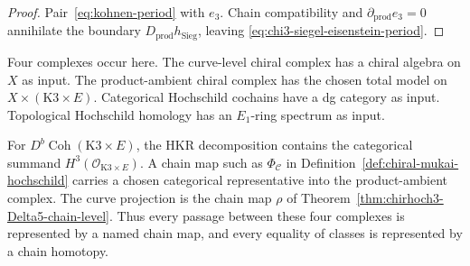 \begin{proof}
Pair~\eqref{eq:kohnen-period} with \(e_3\).  Chain compatibility and
\(\partial_{\mathrm{prod}}e_3=0\) annihilate the boundary
\(D_{\mathrm{prod}}h_{\mathrm{Sieg}}\), leaving
\eqref{eq:chi3-siegel-eisenstein-period}.
\end{proof}

\begin{remark}
\label{rem:chirhoch3-Delta5-scope-discipline}
Four complexes occur here.  The curve-level chiral complex has a chiral
algebra on \(X\) as input.  The product-ambient chiral complex has the
chosen total model on \(X\times(\mathrm{K3}\times E)\).  Categorical
Hochschild cochains have a dg category as input.  Topological
Hochschild homology has an \(E_1\)-ring spectrum as input.

For \(D^b\operatorname{Coh}(\mathrm{K3}\times E)\), the HKR
decomposition contains the categorical summand
\(H^3(\mathcal O_{\mathrm{K3}\times E})\).  A chain map such as
\(\Phi_{\mathcal C}\) in
Definition~\ref{def:chiral-mukai-hochschild} carries a chosen
categorical representative into the product-ambient complex.  The
curve projection is the chain map \(\rho\) of
Theorem~\ref{thm:chirhoch3-Delta5-chain-level}.  Thus every passage
between these four complexes is represented by a named chain map, and
every equality of classes is represented by a chain homotopy.
\end{remark}

\providecommand{\Lspin}{L^{\mathrm{spin}}}
\providecommand{\Lstd}{L^{\mathrm{std}}}
\providecommand{\Ladj}{L^{\mathrm{ad}}}
\providecommand{\LambdaFE}{\Lambda}
\providecommand{\DeltaE}{\Delta_{E_6}}
\providecommand{\SpinSp}{\widetilde{\mathrm{Sp}}_4}
\providecommand{\SpinKone}{\widetilde{K(1)}}
\providecommand{\Frob}{\mathrm{Frob}}

